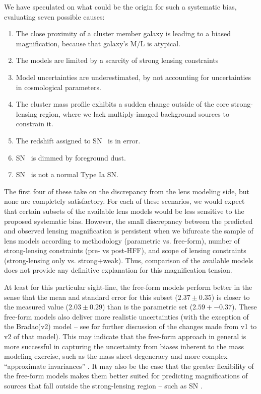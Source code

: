 We have speculated on what could be the origin for such a systematic bias,
evaluating seven possible causes: 

\begin{enumerate}
\item The close proximity of a cluster member galaxy is leading to a
biased magnification, because that galaxy's M/L is atypical.
\item The models are limited by a scarcity of strong lensing constraints
\item Model uncertainties are underestimated, by not accounting for 
       uncertainties in cosmological parameters.
\item The cluster mass profile exhibits a sudden change outside of the core
strong-lensing region, where we lack multiply-imaged background
sources to constrain it.
\item The redshift assigned to SN \tomas\ is in error.
\item SN \tomas\ is dimmed by foreground dust.
\item SN \tomas\ is not a normal Type Ia SN.
\end{enumerate}

\noindent The first four of these take on the discrepancy from 
the lens modeling side, but none are completely satisfactory. For each
of these scenarios, we would expect that certain subsets of the
available lens models would be less sensitive to the proposed
systematic bias.  However, the small discrepancy between the predicted
and observed lensing magnification is persistent when we bifurcate the
sample of lens models according to methodology (parametric
vs. free-form), number of strong-lensing constraints (pre- vs
post-HFF), and scope of lensing constraints (strong-lensing only
vs. strong+weak). Thus, comparison of the available models does not
provide any definitive explanation for this magnification tension.

At least for this particular sight-line, the free-form models perform
better in the sense that the mean and standard error for this subset
($2.37\pm0.35$) is closer to the measured value ($2.03\pm0.29$) than
is the parametric set ($2.59 +- 0.37$).  These free-form models also
deliver more realistic uncertainties (with the exception of the
Bradac(v2) model -- see \citet{Wang:2015} for further discussion of
the changes made from v1 to v2 of that model).   This may
indicate that the free-form approach in general is more successful in
capturing the uncertainty from biases inherent to the mass modeling
exercise, such as the mass sheet degeneracy and more complex
``approximate invariances'' \citep{Liesenborgs:2012,Schneider:2014}.
It may also be the case that the greater flexibility of the free-form
models makes them better suited for predicting magnifications of
sources that fall outside the strong-lensing region -- such as
SN \tomas.


